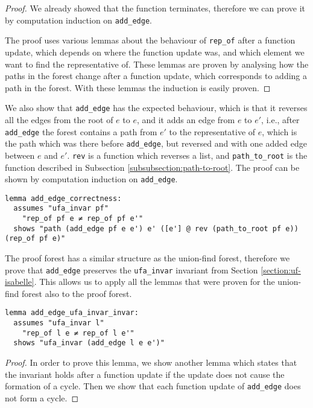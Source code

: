 \begin{proof}
We already showed that the function terminates, therefore we can prove it by computation induction on \lstinline{add_edge}.

The proof uses various lemmas about the behaviour of \lstinline{rep_of} after a function update, which depends on where the function update was, and which element we want to find the representative of. These lemmas are proven by analysing how the paths in the forest change after a function update, which corresponds to adding a path in the forest. With these lemmas the induction is easily proven.
\end{proof}

We also show that \lstinline|add_edge| has the expected behaviour, which is that it reverses all the edges from the root of $e$ to $e$, and it adds an edge from $e$ to $e'$, i.e., after \lstinline|add_edge| the forest contains a path from $e'$ to the representative of $e$, which is the path which was there before \lstinline|add_edge|, but reversed and with one added edge between $e$ and $e'$. \lstinline|rev| is a function which reverses a list, and \lstinline|path_to_root| is the function described in Subsection \ref{subsubsection:path-to-root}. The proof can be shown by computation induction on \lstinline|add_edge|.

\begin{lstlisting}
lemma add_edge_correctness:
  assumes "ufa_invar pf"
    "rep_of pf e ≠ rep_of pf e'"
  shows "path (add_edge pf e e') e' ([e'] @ rev (path_to_root pf e)) (rep_of pf e)"
\end{lstlisting}

The proof forest has a similar structure as the union-find forest, therefore we prove that \lstinline|add_edge| preserves the \lstinline|ufa_invar| invariant from Section \ref{section:uf-isabelle}. This allows us to apply all the lemmas that were proven for the union-find forest also to the proof forest.

\begin{lstlisting}
lemma add_edge_ufa_invar_invar:
  assumes "ufa_invar l"
    "rep_of l e ≠ rep_of l e'"
  shows "ufa_invar (add_edge l e e')"
\end{lstlisting}

\begin{proof}
In order to prove this lemma, we show another lemma which states that the invariant holds after a function update if the update does not cause the formation of a cycle. Then we show that each function update of \lstinline{add_edge} does not form a cycle.
\end{proof}

